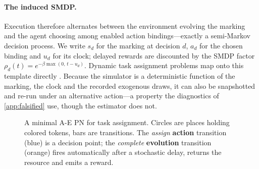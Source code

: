 \documentclass[review,authoryear,3p,times]{elsarticle}
\begin{document}
\paragraph{The induced SMDP.} Execution therefore alternates between the
environment evolving the marking and the agent choosing among enabled action
bindings---exactly a semi-Markov decision process. We write $s_d$ for the
marking at decision $d$, $a_d$ for the chosen binding and $u_d$ for its clock;
delayed rewards are discounted by the SMDP factor
$\rho_d(t)=e^{-\beta\max(0,\,t-u_d)}$. Dynamic task assignment problems map onto
this template directly \citep{aepn2023,aepn_repr2025,gympn2025}. Because the
simulator is a deterministic function of the marking, the clock and the recorded
exogenous draws, it can also be snapshotted and re-run under an alternative
action---a property the diagnostics of \ref{app:falsified} use, though
the estimator does not.

\begin{figure}[tbp]
\centering
{}
\caption{A minimal A-E PN for task assignment. Circles are places holding
colored tokens, bars are transitions. The \emph{assign} \textbf{action}
transition (blue) is a decision point; the \emph{complete} \textbf{evolution}
transition (orange) fires automatically after a stochastic delay, returns the
resource and emits a reward.}
\label{fig:aepn}
\end{figure}
\end{document}
